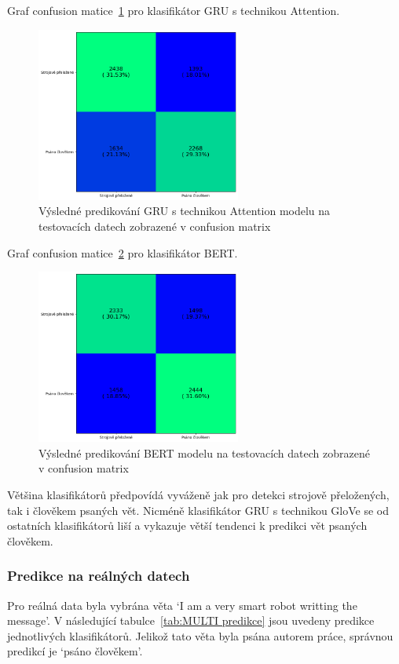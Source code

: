 Graf confusion matice~\ref{fig:MULTI GRU Attention model conf} pro klasifikátor GRU s technikou Attention.
\begin{figure}[H]
	\centering
	\includegraphics[width=0.6\textwidth]{Figures/MULTI_GRU_Attention_conf.png}
	\caption{Výsledné predikování GRU s technikou Attention modelu na testovacích datech zobrazené v confusion matrix}\label{fig:MULTI GRU Attention model conf}
\end{figure}

Graf confusion matice~\ref{fig:MULTI BERT model conf} pro klasifikátor BERT.\@
\begin{figure}[H]
	\centering
	\includegraphics[width=0.6\textwidth]{Figures/MULTI_BERT_conf.png}
	\caption{Výsledné predikování BERT modelu na testovacích datech zobrazené v confusion matrix}\label{fig:MULTI BERT model conf}
\end{figure}

Většina klasifikátorů předpovídá vyváženě jak pro detekci strojově přeložených, tak i člověkem psaných vět.
Nicméně klasifikátor GRU s technikou GloVe se od ostatních klasifikátorů liší a vykazuje větší tendenci k predikci vět psaných člověkem.


\subsubsection{Predikce na reálných datech}
Pro reálná data byla vybrána věta `I am a very smart robot writting the message'.
V následující tabulce~\ref{tab:MULTI predikce} jsou uvedeny predikce jednotlivých klasifikátorů.
Jelikož tato věta byla psána autorem práce, správnou predikcí je `psáno člověkem'.

